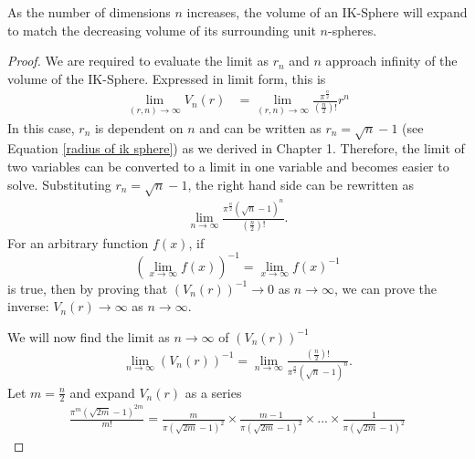 \begin{theorem}\label{theorem:volume of IK-Sphere}
As the number of dimensions $n$ increases, the volume of an IK-Sphere will expand to match the decreasing volume of its surrounding unit $n$-spheres. 
\end{theorem}

\begin{proof}
    We are required to evaluate the limit as $r_n$ and $n$ approach infinity of the volume of the IK-Sphere. Expressed in limit form, this is
    \begin{align*}
        \lim_{(r,n)\to\infty}V_n(r)&=\lim_{(r,n)\to\infty}\frac{\pi^{\frac{n}{2}}}{\left(\frac{n}{2}\right)!}r^n
    \end{align*}
    In this case, $r_n$ is dependent on $n$ and can be written as $r_n=\sqrt{n}-1$ (see Equation \ref{radius of ik sphere}) as we derived in Chapter 1. Therefore, the limit of two variables can be converted to a limit in one variable and becomes easier to solve. Substituting $r_n=\sqrt{n}-1$, the right hand side can be rewritten as
    \begin{align*}
        \lim_{n\to\infty}\frac{\pi^{\frac{n}{2}}{\left(\sqrt{n}-1\right)}^n}{\left(\frac{n}{2}\right)!}.
    \end{align*}
    For an arbitrary function $f(x)$, if $$\left(\lim_{x \to \infty} f(x)\right)^{-1}=\lim_{x \to \infty} f(x)^{-1}$$ is true, then by proving that $(V_n(r))^{-1} \to 0$ as $n \to \infty$, we can prove the inverse: $V_n(r) \to \infty$ as $n \to \infty$.
    
    \noindent
    We will now find the limit as $n \to \infty$ of $(V_n(r))^{-1}$ 
    \begin{align*}
        \lim_{n\to\infty}(V_n(r))^{-1}=\lim_{n\to\infty}\frac{\left(\frac{n}{2}\right)!}{\pi^{\frac{n}{2}}{\left(\sqrt{n}-1\right)}^n}.
    \end{align*}
    \noindent
    Let $m=\frac{n}{2}$ and expand $V_n(r)$ as a series
    \begin{align*}
        \frac{\pi^m{\left(\sqrt{2m}-1\right)}^{2m}}{m!}=\frac{m}{\pi(\sqrt{2m}-1)^2} \times \frac{m-1}{\pi(\sqrt{2m}-1)^2} \times ... \times \frac{1}{\pi(\sqrt{2m}-1)^2}
    \end{align*}
\end{proof}

